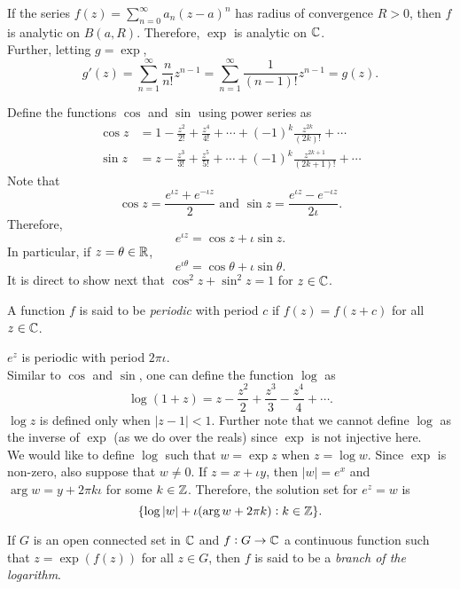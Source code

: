 	If the series $f(z) = \sum_{n=0}^\infty a_n (z-a)^n$ has radius of convergence $R > 0$, then $f$ is analytic on $B(a,R)$. Therefore, $\exp$ is analytic on $\mathbb{C}$.\\
	Further, letting $g = \exp$,
	\[ g'(z) = \sum_{n=1}^\infty \frac{n}{n!} z^{n-1} = \sum_{n=1}^\infty \frac{1}{(n-1)!} z^{n-1} = g(z). \]

	Define the functions $\cos$ and $\sin$ using power series as
	\begin{align*}
		\cos z &= 1 - \frac{z^2}{2!} + \frac{z^4}{4!} + \cdots + (-1)^k \frac{z^{2k}}{(2k)!} + \cdots \\
		\sin z &= z - \frac{z^3}{3!} + \frac{z^5}{5!} + \cdots + (-1)^k \frac{z^{2k+1}}{(2k+1)!} + \cdots
	\end{align*}
	Note that
	\[ \cos z = \frac{e^{\iota z} + e^{-\iota z}}{2} \text{ and } \sin z = \frac{e^{\iota z} - e^{-\iota z}}{2\iota}. \]
	Therefore,
	\[ e^{\iota z} = \cos z + \iota \sin z. \]
	In particular, if $z = \theta \in \mathbb{R}$,
	\[ e^{\iota \theta} = \cos \theta + \iota \sin \theta. \]
	It is direct to show next that $\cos^2 z + \sin^2 z = 1$ for $z \in \mathbb{C}$.

	\begin{definition}
		A function $f$ is said to be \emph{periodic} with period $c$ if $f(z) = f(z+c)$ for all $z\in\mathbb{C}$.
	\end{definition}

	$e^{z}$ is periodic with period $2\pi\iota$.\\

	Similar to $\cos$ and $\sin$, one can define the function $\log$ as
	\[ \log (1 + z) = z - \frac{z^2}{2} + \frac{z^3}{3} - \frac{z^4}{4} + \cdots. \]
	$\log z$ is defined only when $|z-1| < 1$. Further note that we cannot define $\log$ as the inverse of $\exp$ (as we do over the reals) since $\exp$ is not injective here.\\
	We would like to define $\log$ such that $w = \exp z$ when $z = \log w$. Since $\exp$ is non-zero, also suppose that $w \ne 0$. If $z = x + \iota y$, then $|w| = e^x$ and $\arg w = y + 2\pi k\iota$ for some $k\in\mathbb{Z}$. Therefore, the solution set for $e^z = w$ is
	\[ \{ \log |w| + \iota (\arg w + 2\pi k) : k \in \mathbb{Z} \}. \]

	\begin{fdef}
		If $G$ is an open connected set in $\mathbb{C}$ and $f : G \to \mathbb{C}$ a continuous function such that $z = \exp(f(z))$ for all $z \in G$, then $f$ is said to be a \emph{branch of the logarithm}.
	\end{fdef}

